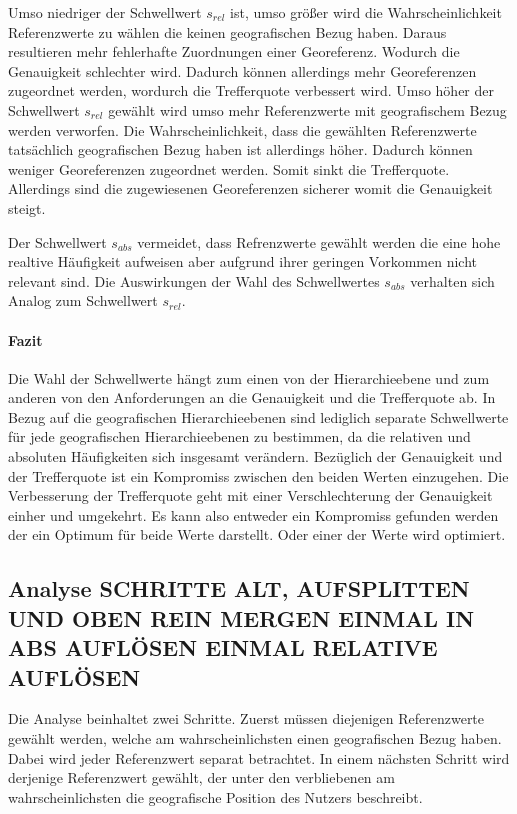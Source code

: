 				Umso niedriger der Schwellwert $s_{rel}$ ist, umso größer wird die Wahrscheinlichkeit Referenzwerte zu wählen die keinen geografischen Bezug haben.
				Daraus resultieren mehr fehlerhafte Zuordnungen einer Georeferenz.
				Wodurch die Genauigkeit schlechter wird.
				Dadurch können allerdings mehr Georeferenzen zugeordnet werden, wordurch die Trefferquote verbessert wird.
				Umso höher der Schwellwert $s_{rel}$ gewählt wird umso mehr Referenzwerte mit geografischem Bezug werden verworfen.
				Die Wahrscheinlichkeit, dass die gewählten Referenzwerte tatsächlich geografischen Bezug haben ist allerdings höher.
				Dadurch können weniger Georeferenzen zugeordnet werden.
				Somit sinkt die Trefferquote.
				Allerdings sind die zugewiesenen Georeferenzen sicherer womit die Genauigkeit steigt.

				Der Schwellwert $s_{abs}$ vermeidet, dass Refrenzwerte gewählt werden die eine hohe realtive Häufigkeit aufweisen aber aufgrund ihrer geringen Vorkommen nicht relevant sind.
				Die Auswirkungen der Wahl des Schwellwertes $s_{abs}$ verhalten sich Analog zum Schwellwert $s_{rel}$.

			\paragraph{Fazit}

				Die Wahl der Schwellwerte hängt zum einen von der Hierarchieebene und zum anderen von den Anforderungen an die Genauigkeit und die Trefferquote ab.
				In Bezug auf die geografischen Hierarchieebenen sind lediglich separate Schwellwerte für jede geografischen Hierarchieebenen zu bestimmen, da die relativen und absoluten Häufigkeiten sich insgesamt verändern.
				Bezüglich der Genauigkeit und der Trefferquote ist ein Kompromiss zwischen den beiden Werten einzugehen. 
				Die Verbesserung der Trefferquote geht mit einer Verschlechterung der Genauigkeit einher und umgekehrt.
				Es kann also entweder ein Kompromiss gefunden werden der ein Optimum für beide Werte darstellt. 
				Oder einer der Werte wird optimiert.  

	\subsection{Analyse SCHRITTE ALT, AUFSPLITTEN UND OBEN REIN MERGEN EINMAL IN ABS AUFLÖSEN EINMAL RELATIVE AUFLÖSEN}

			Die Analyse beinhaltet zwei Schritte. 
			Zuerst müssen diejenigen Referenzwerte gewählt werden, welche am wahrscheinlichsten einen geografischen Bezug haben.
			Dabei wird jeder Referenzwert separat betrachtet. 
			In einem nächsten Schritt wird derjenige Referenzwert gewählt, der unter den verbliebenen am wahrscheinlichsten die geografische Position des Nutzers beschreibt. 

